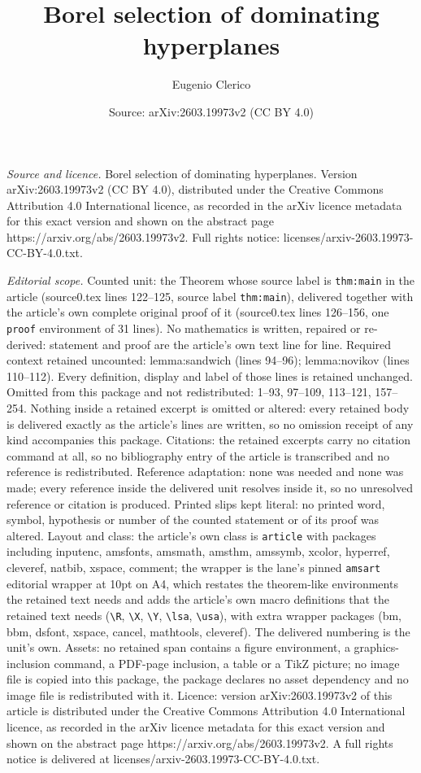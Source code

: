\documentclass[10pt,a4paper]{amsart}
\title[Borel selection of dominating hyperplanes]{Borel selection of dominating hyperplanes}
\author{Eugenio Clerico}
\date{Source: arXiv:2603.19973v2 (CC BY 4.0)}
\begin{document}
\maketitle

\noindent\emph{Source and licence.} Borel selection of dominating hyperplanes. Version arXiv:2603.19973v2 (CC BY 4.0), distributed under the Creative Commons Attribution 4.0 International licence, as recorded in the arXiv licence metadata for this exact version and shown on the abstract page https://arxiv.org/abs/2603.19973v2. Full rights notice: licenses/arxiv-2603.19973-CC-BY-4.0.txt.\par\smallskip

\noindent\textit{Editorial scope.} Counted unit: the Theorem whose source label is \texttt{thm:main} in the article (source0.tex lines 122--125, source label \texttt{thm:main}), delivered together with the article's own complete original proof of it (source0.tex lines 126--156, one \texttt{proof} environment of 31 lines). No mathematics is written, repaired or re-derived: statement and proof are the article's own text line for line. Required context retained uncounted: lemma:sandwich (lines 94--96); lemma:novikov (lines 110--112). Every definition, display and label of those lines is retained unchanged. Omitted from this package and not redistributed: 1--93, 97--109, 113--121, 157--254. Nothing inside a retained excerpt is omitted or altered: every retained body is delivered exactly as the article's lines are written, so no omission receipt of any kind accompanies this package. Citations: the retained excerpts carry no citation command at all, so no bibliography entry of the article is transcribed and no reference is redistributed. Reference adaptation: none was needed and none was made; every reference inside the delivered unit resolves inside it, so no unresolved reference or citation is produced. Printed slips kept literal: no printed word, symbol, hypothesis or number of the counted statement or of its proof was altered. Layout and class: the article's own class is \texttt{article} with packages including inputenc, amsfonts, amsmath, amsthm, amssymb, xcolor, hyperref, cleveref, natbib, xspace, comment; the wrapper is the lane's pinned \texttt{amsart} editorial wrapper at 10pt on A4, which restates the theorem-like environments the retained text needs and adds the article's own macro definitions that the retained text needs (\texttt{\textbackslash R}, \texttt{\textbackslash X}, \texttt{\textbackslash Y}, \texttt{\textbackslash lsa}, \texttt{\textbackslash usa}), with extra wrapper packages (bm, bbm, dsfont, xspace, cancel, mathtools, cleveref). The delivered numbering is the unit's own. Assets: no retained span contains a figure environment, a graphics-inclusion command, a PDF-page inclusion, a table or a TikZ picture; no image file is copied into this package, the package declares no asset dependency and no image file is redistributed with it. Licence: version arXiv:2603.19973v2 of this article is distributed under the Creative Commons Attribution 4.0 International licence, as recorded in the arXiv licence metadata for this exact version and shown on the abstract page https://arxiv.org/abs/2603.19973v2. A full rights notice is delivered at licenses/arxiv-2603.19973-CC-BY-4.0.txt. 
\end{document}
